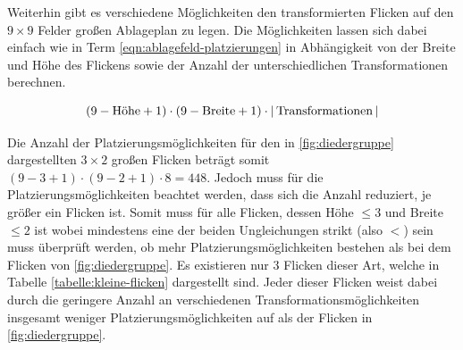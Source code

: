 Weiterhin gibt es verschiedene Möglichkeiten den transformierten Flicken auf den $9\times9$ Felder großen Ablageplan zu legen. Die Möglichkeiten lassen sich dabei einfach wie in Term \ref{eqn:ablagefeld-platzierungen} in Abhängigkeit von der Breite und Höhe des Flickens sowie der Anzahl der unterschiedlichen Transformationen berechnen.

\vspace*{-0.28cm}
\vspace*{-0.4cm}
\begin{equation}
    \label{eqn:ablagefeld-platzierungen}
    \left( 9 - \text{Höhe}  + 1 \right) \cdot
    \left( 9 - \text{Breite} + 1 \right) \cdot
    \left\lvert\, \text{Transformationen} \,\right\rvert
    \vspace*{-0.28cm}
\end{equation}

Die Anzahl der Platzierungsmöglichkeiten für den in \ref{fig:diedergruppe} dargestellten $3\times 2$ großen Flicken beträgt somit $\left( 9 - 3 + 1 \right) \cdot \left( 9 - 2 + 1 \right) \cdot 8 = 448$. Jedoch muss für die Platzierungsmöglichkeiten beachtet werden, dass sich die Anzahl reduziert, je größer ein Flicken ist. Somit muss für alle Flicken, dessen Höhe $\le 3$ und Breite $\le 2$ ist \textemdash{} wobei mindestens eine der beiden Ungleichungen strikt (also $<$) sein muss \textemdash{} überprüft werden, ob mehr Platzierungsmöglichkeiten bestehen als bei dem Flicken von \ref{fig:diedergruppe}. Es existieren nur 3 Flicken dieser Art, welche in Tabelle \ref{tabelle:kleine-flicken} dargestellt sind. Jeder dieser Flicken weist dabei durch die geringere Anzahl an verschiedenen Transformationsmöglichkeiten insgesamt weniger Platzierungsmöglichkeiten auf als der Flicken in \ref{fig:diedergruppe}.

